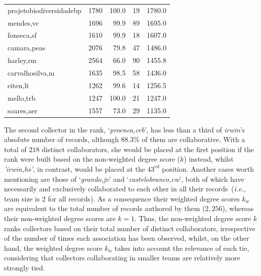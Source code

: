 \begin{table}[t]
\begin{center}
\begin{tabular}{l r r r r}
      projetobiodiversidadebp & 1780 & 100.0 & 19 & 1780.0 \\
      mendes,vc & 1696 & 99.9 & 89 & 1695.0 \\
      fonseca,sf & 1610 & 99.9 & 18 & 1607.0 \\
      camara,peas & 2076 & 79.8 & 47 & 1486.0 \\
      harley,rm & 2564 & 66.0 & 90 & 1455.8 \\
      carvalhosilva,m & 1635 & 98.5 & 58 & 1436.0 \\
      eiten,lt & 1262 & 99.6 & 14 & 1256.5 \\
      mello,trb & 1247 & 100.0 & 21 & 1247.0 \\
      soares,aer & 1557 & 73.0 & 29 & 1135.0 \\
      \hline
  \end{tabular}
  \label{table:ub_cwn_degree}
  \end{center}
\end{table}
%
The second collector in the rank, `\textit{proenca,ceb}', has less than a third of \textit{irwin}'s absolute number of records, although $88.3\%$ of them are collaborative. 
With a total of $218$ distinct collaborators, she would be placed at the first position if the rank were built based on the non-weighted degree score ($k$) instead, whilst \textit{'irwin,hs'}, in contrast, would be placed at the $43^{rd}$ position.
%
Another cases worth mentioning are those of `\textit{grando,jv}' and `\textit{castelobranco,cw}', both of which have necessarily and exclusively collaborated to each other in all their records~(\textit{i.e.}, team size is $2$ for all records).
As a consequence their weighted degree scores $k_w$ are equivalent to the total number of records authored by them ($2,256$), whereas their non-weighted degree scores are $k=1$.
%
Thus, the non-weighted degree score $k$ ranks collectors based on their total number of distinct collaborators, irrespective of the  number of times each association has been observed, whilst, on the other hand, the weighted degree score $k_w$ takes into account the relevance of each tie, considering that collectors collaborating in smaller teams are relatively more strongly tied.

